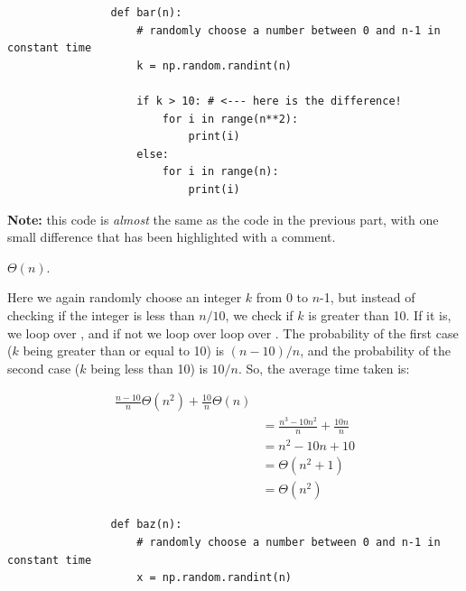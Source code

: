 \begin{prob}
\begin{subprobset}
        \begin{subprob}
            \begin{verbatim}
                def bar(n):
                    # randomly choose a number between 0 and n-1 in constant time
                    k = np.random.randint(n)

                    if k > 10: # <--- here is the difference!
                        for i in range(n**2):
                            print(i)
                    else:
                        for i in range(n):
                            print(i)
            \end{verbatim}

            \textbf{Note:} this code is \emph{almost} the same as the code in
            the previous part, with one small difference that has been
            highlighted with a comment.


            \begin{soln}
                $\Theta(n)$.

                Here we again randomly choose an integer $k$ from 0 to $n$-1,
                but instead of checking if the integer is less than $n/10$, we
                check if $k$ is greater than 10. If it is, we loop over
                , and if not we loop over loop over
                . The probability of the first case ($k$ being
                greater than or equal to 10) is $(n-10)/n$, and the probability
                of the second case ($k$ being less than 10) is $10/n$. So, the
                average time taken is:

                \begin{align*}
                    \frac{n-10}{n} \Theta(n^{2}) + \frac{10}{n} \Theta(n)\\
                    &=
                    \frac{n^3 - 10n^2}{n} + \frac{10n}{n}\\
                    &=
                    n^2 - 10n + 10\\
                    &=
                    \Theta(n^2 + 1)\\
                    &=
                    \Theta(n^2)
                \end{align*}

            \end{soln}

        \end{subprob}

        \begin{subprob}
            \begin{verbatim}
                def baz(n):
                    # randomly choose a number between 0 and n-1 in constant time
                    x = np.random.randint(n)


\end{verbatim}
\end{subprob}
\end{subprobset}
\end{prob}
